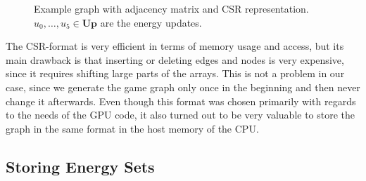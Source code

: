 \begin{figure}[ht]
\begin{center}
\end{center}
\caption{Example graph with adjacency matrix and CSR representation.
    $u_0, \ldots, u_5 \in \mathbf{Up}$ are the energy updates.
}%
\label{fig:csr}
\end{figure}

The CSR-format is very efficient in terms of memory usage and access,
but its main drawback is that inserting or deleting edges and nodes is very
expensive, since it requires shifting large parts of the arrays.
This is not a problem in our case, since we generate the game graph only once
in the beginning and then never change it afterwards.
Even though this format was chosen primarily with regards to the needs
of the GPU code, it also turned out to be very valuable to store the graph in
the same format in the host memory of the CPU\@.


\subsection{Storing Energy Sets}\label{subsec:energy_memory}

